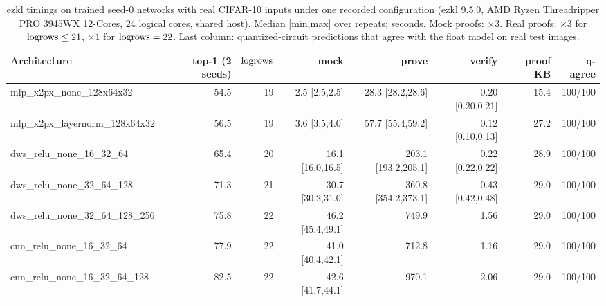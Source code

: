 \begin{table}[h]
\centering
\caption{ezkl timings on trained seed-0 networks with real CIFAR-10 inputs under one recorded configuration
  (ezkl 9.5.0, AMD Ryzen Threadripper PRO 3945WX 12-Cores, 24 logical cores, shared host).  Median [min,max] over
  repeats; seconds.  Mock proofs: $\times3$.  Real proofs: $\times3$ for $\mathrm{logrows}\le21$, $\times1$ for $\mathrm{logrows}=22$.  Last column: quantized-circuit predictions that agree with the float model on real test images.}
\label{tab:ezkl}
\scriptsize
\begin{tabular}{lrrrrrrr}
\toprule
\textbf{Architecture} & \textbf{top-1 (2 seeds)} & $\mathrm{logrows}$ & \textbf{mock} & \textbf{prove} & \textbf{verify} & \textbf{proof KB} & \textbf{q-agree} \\
\midrule
mlp\_x2px\_none\_128x64x32 & 54.5 & 19 & 2.5 {\scriptsize[2.5,2.5]} & 28.3 {\scriptsize[28.2,28.6]} & 0.20 {\scriptsize[0.20,0.21]} & 15.4 & 100/100 \\
mlp\_x2px\_layernorm\_128x64x32 & 56.5 & 19 & 3.6 {\scriptsize[3.5,4.0]} & 57.7 {\scriptsize[55.4,59.2]} & 0.12 {\scriptsize[0.10,0.13]} & 27.2 & 100/100 \\
dws\_relu\_none\_16\_32\_64 & 65.4 & 20 & 16.1 {\scriptsize[16.0,16.5]} & 203.1 {\scriptsize[193.2,205.1]} & 0.22 {\scriptsize[0.22,0.22]} & 28.9 & 100/100 \\
dws\_relu\_none\_32\_64\_128 & 71.3 & 21 & 30.7 {\scriptsize[30.2,31.0]} & 360.8 {\scriptsize[354.2,373.1]} & 0.43 {\scriptsize[0.42,0.48]} & 29.0 & 100/100 \\
dws\_relu\_none\_32\_64\_128\_256 & 75.8 & 22 & 46.2 {\scriptsize[45.4,49.1]} & 749.9 & 1.56 & 29.0 & 100/100 \\
cnn\_relu\_none\_16\_32\_64 & 77.9 & 22 & 41.0 {\scriptsize[40.4,42.1]} & 712.8 & 1.16 & 29.0 & 100/100 \\
cnn\_relu\_none\_16\_32\_64\_128 & 82.5 & 22 & 42.6 {\scriptsize[41.7,44.1]} & 970.1 & 2.06 & 29.0 & 100/100 \\
\bottomrule
\end{tabular}
\end{table}
